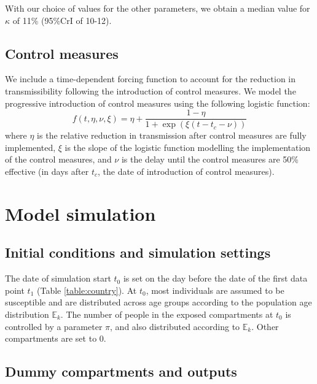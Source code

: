 \documentclass{article}
\begin{document}
With our choice of values for the other parameters, we obtain a median value for $\kappa$ of 11\% (95\%CrI of 10-12).

\subsection{Control measures}
	
	We include a time-dependent forcing function to account for the reduction in transmissibility following the introduction of control measures.
	We model the progressive introduction of control measures using the following logistic function:
	\begin{equation}
	f(t,\eta,\nu, \xi) = \eta + \frac{1-\eta}{1+\exp(\xi(t-t_c-\nu))}
	\end{equation}
	where $\eta$ is the relative reduction in transmission after control measures are fully implemented, $\xi$ is the slope of the logistic function modelling the implementation of the control measures, and $\nu$ is the delay until the control measures are 50\% effective (in days after $t_c$, the date of introduction of control measures).

\section{Model simulation}
\label{sec:modelsim}
	\subsection{Initial conditions and simulation settings}
	
	The date of simulation start $t_0$ is set on the day before the date of the first data point $t_1$ (Table \ref{table:country}).
	At $t_0$, most individuals are assumed to be susceptible and are distributed across age groups according to the population age distribution $\mathds{E}_k$.
	The number of people in the exposed compartments at $t_0$ is controlled by a parameter $\pi$, and also distributed according to $\mathds{E}_k$.
	Other compartments are set to 0.
	
	\subsection{Dummy compartments and outputs}
	\label{sec:correction}
	
\end{document}
